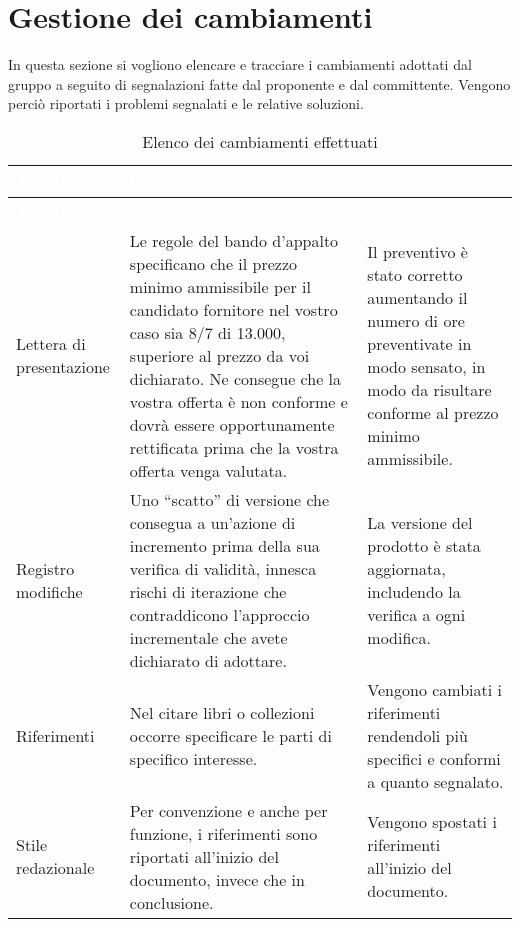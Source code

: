 \section{Gestione dei cambiamenti}
In questa sezione si vogliono elencare e tracciare i cambiamenti adottati dal gruppo a seguito di segnalazioni fatte dal proponente e dal committente. Vengono perciò riportati i problemi segnalati e le relative soluzioni. 
{
	\renewcommand{\arraystretch}{1.5}
	\centering
	\begin{longtable}{ C{2cm} C{6cm} C{6cm}}
		\caption{Elenco dei cambiamenti effettuati}\\
		\textcolor{white}{\textbf{Ambito}} & \textcolor{white}{\textbf{Problema}} & \textcolor{white}{\textbf{Soluzione}}\\
		\endfirsthead
		\textcolor{white}{\textbf{Ambito}} & \textcolor{white}{\textbf{Problema}} & \textcolor{white}{\textbf{Soluzione}}\\
		\endhead
		Lettera di presentazione & Le regole del
		bando d’appalto specificano che il prezzo minimo ammissibile per il
		candidato fornitore nel vostro caso sia 8/7 di 13.000, superiore al prezzo da
		voi dichiarato. Ne consegue che la vostra offerta è non conforme e dovrà
		essere opportunamente rettificata prima che la vostra offerta venga valutata.
		& Il preventivo è stato corretto aumentando il numero di ore preventivate in modo sensato, in modo da risultare conforme al prezzo minimo ammissibile.\\
		
		Registro modifiche &  Uno “scatto” di versione che
		consegua a un’azione di incremento prima della sua verifica di validità,
		innesca rischi di iterazione che contraddicono l’approccio incrementale che
		avete dichiarato di adottare. & La versione del prodotto è stata aggiornata, includendo la verifica a ogni modifica.\\
		
		Riferimenti & Nel citare libri o collezioni occorre specificare le parti di specifico interesse. & Vengono cambiati i riferimenti rendendoli più specifici e conformi a quanto segnalato.\\
		
		Stile redazionale & Per convenzione e anche per funzione, i riferimenti sono riportati all’inizio del documento, invece che in conclusione. & Vengono spostati i riferimenti all'inizio del documento.\\
		

\end{longtable}}
